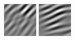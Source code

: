 \begin{figure}
\begin{center}
  \includegraphics[width=\columnwidth/9]{ch4/figures/imag_3_2.jpg}
  \includegraphics[width=\columnwidth/9]{ch4/figures/imag_3_3.jpg}

\end{center}
\end{figure}
